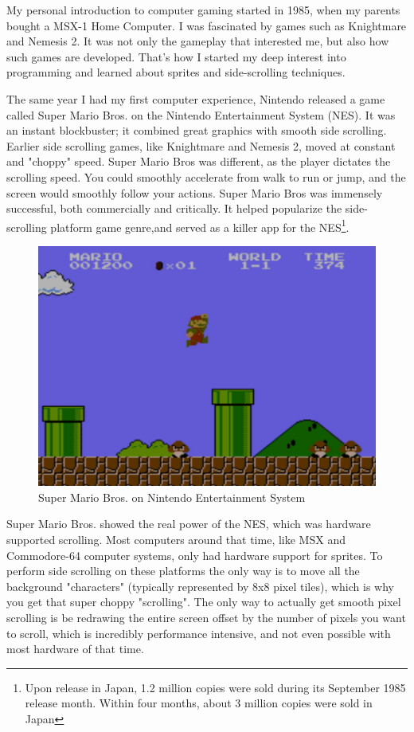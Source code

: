 \documentclass[book.tex]{subfiles}
\begin{document}
My personal introduction to computer gaming started in 1985, when my parents bought a MSX-1 Home Computer. I was fascinated by games such as Knightmare and Nemesis 2. It was not only the gameplay that interested me, but also how such games are developed. That's how I started my deep interest into programming and learned about sprites and side-scrolling techniques.\\
\par
The same year I had my first computer experience, Nintendo released a game called Super Mario Bros. on the Nintendo Entertainment System (NES). It was an instant blockbuster; it combined great graphics with smooth side scrolling. Earlier side scrolling games, like Knightmare and Nemesis 2, moved at constant and "choppy" speed. Super Mario Bros was different, as the player dictates the scrolling speed. You could smoothly accelerate from walk to run or jump, and the screen would smoothly follow your actions. Super Mario Bros was immensely successful, both commercially and critically. It helped popularize the side-scrolling platform game genre,and served as a killer app for the NES\footnote{Upon release in Japan, 1.2 million copies were sold during its September 1985 release month. Within four months, about 3 million copies were sold in Japan}.\\
\begin{figure}[H]
  \centering
 \includegraphics[width=1.0\textwidth]{screenshots_300dpi/Mario_Bros.png}
\caption{Super Mario Bros. on Nintendo Entertainment System}
\end{figure}
\par
Super Mario Bros. showed the real power of the NES, which was hardware supported scrolling. Most computers around that time, like MSX and Commodore-64 computer systems, only had hardware support for sprites. To perform side scrolling on these platforms the only way is to move all the background "characters" (typically represented by 8x8 pixel tiles), which is why you get that super choppy "scrolling". The only way to actually get smooth pixel scrolling is be redrawing the entire screen offset by the number of pixels you want to scroll, which is incredibly performance intensive, and not even possible with most hardware of that time. \\
\end{document}
